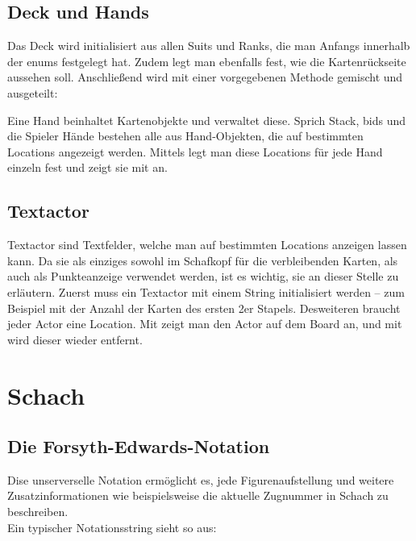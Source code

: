\subsection{Deck und Hands}

Das Deck wird initialisiert aus allen Suits und Ranks, die man Anfangs
innerhalb der enums festgelegt hat. Zudem legt man ebenfalls fest, wie die
Kartenrückseite aussehen soll. Anschließend wird mit einer vorgegebenen Methode
gemischt und ausgeteilt:


Eine Hand beinhaltet Kartenobjekte und verwaltet diese. Sprich Stack, bids und
die Spieler Hände bestehen alle aus Hand-Objekten, die auf bestimmten Locations
angezeigt werden. Mittels  legt man diese Locations für jede Hand einzeln
fest und zeigt sie mit  an.

\subsection{Textactor}

Textactor sind Textfelder, welche man auf bestimmten Locations anzeigen lassen
kann. Da sie als einziges sowohl im Schafkopf für die verbleibenden Karten, als
auch als Punkteanzeige verwendet werden, ist es wichtig, sie an dieser Stelle
zu erläutern. Zuerst muss ein Textactor mit einem String initialisiert werden
-- zum Beispiel mit der Anzahl der Karten des ersten 2er Stapels. Desweiteren
braucht jeder Actor eine Location. Mit 
zeigt man den Actor auf dem Board an, und mit 
wird dieser wieder entfernt.

\section{Schach}

\subsection{Die Forsyth-Edwards-Notation}
\subsectionauthor{\frank}

Dise unserverselle Notation ermöglicht es, jede Figurenaufstellung und weitere
Zusatzinformationen wie beispielsweise die aktuelle Zugnummer in Schach zu
beschreiben.\\ Ein typischer Notationsstring sieht so aus:

